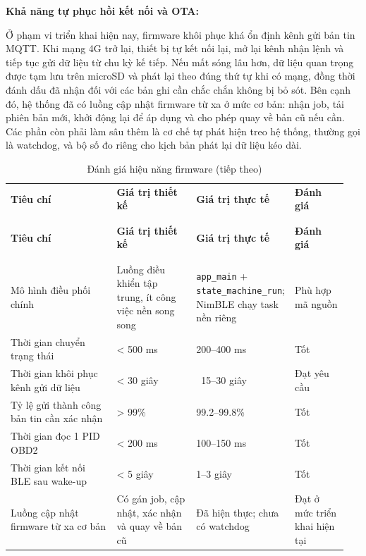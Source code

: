 \documentclass[a4paper]{extarticle}
\newcommand{\thesissettableid}[2]{%
  \renewcommand{\thetable}{#1}%
  \renewcommand{\theHtable}{#2}%
}
\begin{document}
\textbf{Khả năng tự phục hồi kết nối và OTA:}

Ở phạm vi triển khai hiện nay, firmware khôi phục khá ổn định kênh gửi
bản tin MQTT. Khi mạng 4G trở lại, thiết bị tự kết nối lại, mở lại kênh
nhận lệnh và tiếp tục gửi dữ liệu từ chu kỳ kế tiếp. Nếu mất sóng lâu
hơn, dữ liệu quan trọng được tạm lưu trên microSD và phát lại theo đúng
thứ tự khi có mạng, đồng thời đánh dấu đã nhận đối với các bản ghi cần
chắc chắn không bị bỏ sót. Bên cạnh đó, hệ thống đã có luồng cập nhật
firmware từ xa ở mức cơ bản: nhận job, tải phiên bản mới, khởi động lại
để áp dụng và cho phép quay về bản cũ nếu cần. Các phần còn phải làm sâu
thêm là cơ chế tự phát hiện treo hệ thống, thường gọi là watchdog, và bộ
số đo riêng cho kịch bản phát lại dữ liệu kéo dài.


{\thesissettableid{5.2}{tab-ch5-anh-gia-hieu-nang-firmware}
\def\LTcaptype{table}
\begin{longtable}{|L{0.327\linewidth}|L{0.243\linewidth}|L{0.224\linewidth}|L{0.160\linewidth}|}
\caption{Đánh giá hiệu năng firmware}\label{tab:ch5-anh-gia-hieu-nang-firmware}\\
\hline \textbf{Tiêu chí} & \textbf{Giá trị thiết kế} & \textbf{Giá trị thực tế} & \textbf{Đánh giá} \\
\\\hline
\endfirsthead
\caption[]{Đánh giá hiệu năng firmware (tiếp theo)}\\
\hline \textbf{Tiêu chí} & \textbf{Giá trị thiết kế} & \textbf{Giá trị thực tế} & \textbf{Đánh giá} \\
\\\hline
\endhead
\\\hline
\endfoot
\endlastfoot
Mô hình điều phối chính & Luồng điều khiển tập trung, ít công việc nền
song song & \texttt{app\_main} + \nolinkurl{state_machine_run}; NimBLE chạy
task nền riêng & Phù hợp mã nguồn \\\hline
Thời gian chuyển trạng thái & \textless{} 500 ms & 200--400 ms & Tốt \\\hline
Thời gian khôi phục kênh gửi dữ liệu & \textless{} 30 giây & ~15--30
giây & Đạt yêu cầu \\\hline
Tỷ lệ gửi thành công bản tin cần xác nhận & \textgreater{} 99\% & 99.2--99.8\% &
Tốt \\\hline
Thời gian đọc 1 PID OBD2 & \textless{} 200 ms & 100--150 ms & Tốt \\\hline
Thời gian kết nối BLE sau wake-up & \textless{} 5 giây & 1--3 giây &
Tốt \\\hline
Luồng cập nhật firmware từ xa cơ bản & Có gán job, cập nhật, xác nhận và quay về bản cũ & Đã hiện
thực; chưa có watchdog & Đạt ở mức triển khai hiện tại \\\hline
\end{longtable}
}
\end{document}
